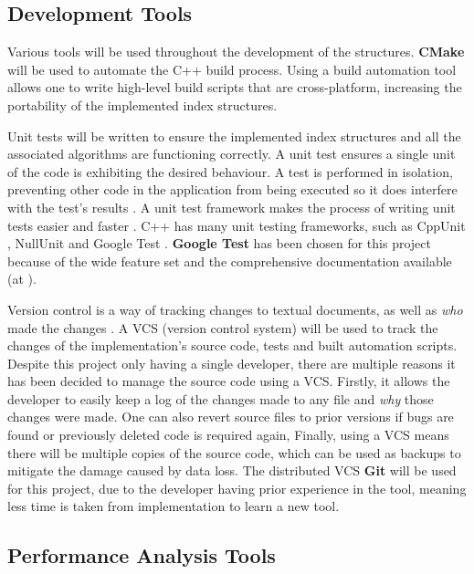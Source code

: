 \subsection{Development Tools}
\label{sec:development-tools}

Various tools will be used throughout the development of the structures. \textbf{CMake} \cite{cmake} will be used to automate the C++ build process. Using a build automation tool allows one to write high-level build scripts that are cross-platform, increasing the portability of the implemented index structures.

Unit tests will be written to ensure the implemented index structures and all the associated algorithms are functioning correctly. A unit test ensures a single unit of the code is exhibiting the desired behaviour. A test is performed in isolation, preventing other code in the application from being executed so it does interfere with the test's results \cite{automated-defect-prevention}. A unit test framework makes the process of writing unit tests easier and faster \cite{unit-test-frameworks}. C++ has many unit testing frameworks, such as CppUnit \cite{cppunit}, NullUnit \cite{nullunit} and Google Test \cite{google-test}. \textbf{Google Test} has been chosen for this project because of the wide feature set and the comprehensive documentation available (at \cite{google-test}).

Version control is a way of tracking changes to textual documents, as well as \textit{who} made the changes \cite{pragmatic-version-control}. A VCS (version control system) will be used to track the changes of the implementation's source code, tests and built automation scripts. Despite this project only having a single developer, there are multiple reasons it has been decided to manage the source code using a VCS. Firstly, it allows the developer to easily keep a log of the changes made to any file and \textit{why} those changes were made. One can also revert source files to prior versions if bugs are found or previously deleted code is required again, Finally, using a VCS means there will be multiple copies of the source code, which can be used as backups to mitigate the damage caused by data loss. The distributed VCS \textbf{Git} \cite{git} will be used for this project, due to the developer having prior experience in the tool, meaning less time is taken from implementation to learn a new tool.

\subsection{Performance Analysis Tools}


